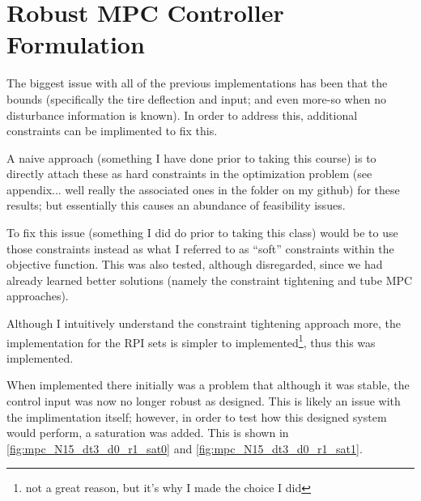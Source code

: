 \documentclass[onecolumn]{IEEEtran}
\begin{document}
\newpage \clearpage
\newpage \clearpage
\section{Robust MPC Controller Formulation}
The biggest issue with all of the previous implementations has been that the bounds (specifically the tire deflection and input; and even more-so when no disturbance information is known).
In order to address this, additional constraints can be implimented to fix this.

A naive approach (something I have done prior to taking this course) is to directly attach these as hard constraints in the optimization problem (see appendix... well really the associated ones in the folder on my github) for these results; but essentially this causes an abundance of feasibility issues.

To fix this issue (something I did do prior to taking this class) would be to use those constraints instead as what I referred to as ``soft'' constraints within the objective function.
This was also tested, although disregarded, since we had already learned better solutions (namely the constraint tightening and tube MPC approaches).

Although I intuitively understand the constraint tightening approach more, the implementation for the RPI sets is simpler to implemented\footnote{not a great reason, but it's why I made the choice I did}, thus this was implemented.

When implemented there initially was a problem that although it was stable, the control input was now no longer robust as designed.
This is likely an issue with the implimentation itself; however, in order to test how this designed system would perform, a saturation was added.
This is shown in \autoref{fig:mpc_N15_dt3_d0_r1_sat0} and \autoref{fig:mpc_N15_dt3_d0_r1_sat1}.
\end{document}
